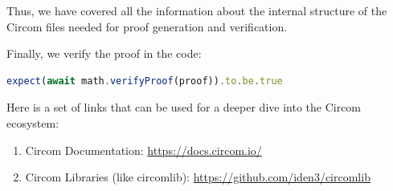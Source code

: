 \documentclass[../lecture-notes-148x210.tex]{subfiles}
\begin{document}
Thus, we have covered all the information about the internal structure of the Circom files needed for proof generation and verification.

Finally, we verify the proof in the code:
\begin{lstlisting}[language=TypeScript,numbers=none,basicstyle=\footnotesize\ttfamily\normalsize]
expect(await math.verifyProof(proof)).to.be.true
\end{lstlisting}
\begin{remark}
    \vspace{-1em}
    Here is a set of links that can be used for a deeper dive into the Circom ecosystem:
    \begin{enumerate}
        \item Circom Documentation: \url{https://docs.circom.io/}
        \item Circom Libraries (like circomlib): \url{https://github.com/iden3/circomlib}
    \end{enumerate}
\end{remark}
\end{document}
